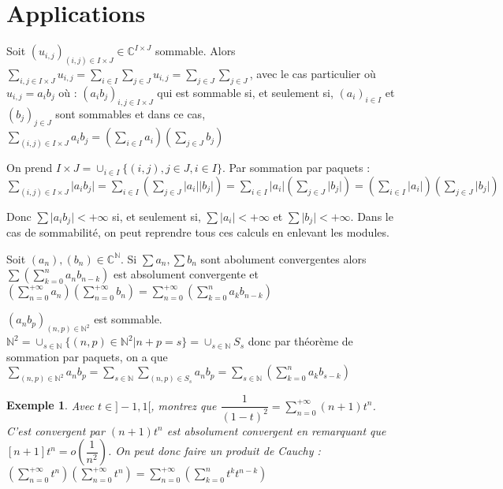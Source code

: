 \documentclass[a4paper,12pt]{book}
\newcommand{\Thr}[2]{\begin{tcolorbox}[sharp corners, colback=white,colframe=red!90!black!75, title=Théorème : #1]#2\end{tcolorbox}}
\newcommand{\Pre}[1]{\begin{tcolorbox}[sharp corners, colback=white,colframe=green!60!green!30!black!75, title=Preuve]#1\end{tcolorbox}}
\newtheorem{Exe}{Exemple}[section]
\def\C{\mathbb{C}}
\def\N{\mathbb{N}}
\begin{document}
\section{Applications}
\Thr{de Fubini}{Soit $(u_{i,j})_{(i,j)\in I\times J}\in\C^{I\times J}$ sommable. Alors $\sum\limits_{i,j\in I\times J} u_{i,j} = \sum\limits_{i\in I}\sum\limits_{j\in J}u_{i,j} = \sum\limits_{j\in J}\sum\limits_{j\in J}$, avec le cas particulier où $u_{i,j} = a_ib_j$ où : $(a_ib_j)_{i,j\in I\times J}$ qui est sommable si, et seulement si, $(a_i)_{i\in I}$ et $(b_j)_{j\in J}$ sont sommables et dans ce cas, $\sum\limits_{(i,j)\in I\times J} a_ib_j = \left(\sum\limits_{i\in I}a_i\right)\left(\sum\limits_{j\in J}b_j\right)$}
\Pre{On prend $I\times J = \cup_{i\in I}\{(i,j), j\in J, i\in I\}$. Par sommation par paquets : $\sum\limits_{(i,j)\in I\times J}\vert a_ib_j\vert = \sum\limits_{i\in I} \left(\sum\limits_{j\in J} \vert a_i\vert \vert b_j\vert\right) = \sum\limits_{i\in I}\vert a_i\vert \left(\sum\limits_{j\in J}\vert b_j\vert\right) = \left(\sum\limits_{i\in I}\vert a_i\vert\right)\left(\sum\limits_{j\in J}\vert b_j\vert\right)$
\par Donc $\sum\vert a_ib_j\vert<+\infty$ si, et seulement si, $\sum\vert a_i\vert<+\infty$ et $\sum\vert b_j\vert < +\infty$. Dans le cas de sommabilité, on peut reprendre tous ces calculs en enlevant les modules.}
\Thr{Produit de Cauchy}{Soit $(a_n), (b_n)\in\C^\N$. Si $\sum a_n, \sum b_n$ sont abolument convergentes alors $\sum\left(\sum\limits_{k=0}^na_nb_{n-k}\right)$ est absolument convergente et $\left(\sum\limits_{n=0}^{+\infty}a_n\right)\left(\sum\limits_{n=0}^{+\infty}b_n\right) = \sum\limits_{n=0}^{+\infty}\left(\sum\limits_{k=0}^n a_kb_{n-k}\right)$}
\Pre{$(a_nb_p)_{(n,p)\in\N^2}$ est sommable. $\N^2 = \cup_{s\in\N} \{(n,p)\in\N^2\vert n+p=s\} = \cup_{s\in\N} S_s$ donc par théorème de sommation par paquets, on a que $\sum\limits_{(n,p)\in\N^2}a_nb_p = \sum\limits_{s\in\N} \sum\limits_{(n,p)\in S_s}a_nb_p = \sum\limits_{s\in\N}\left(\sum\limits_{k=0}^na_kb_{s-k}\right)$}
\begin{Exe}
Avec $t\in]-1,1[$, montrez que $\dfrac{1}{(1-t)^2} = \sum\limits_{n=0}^{+\infty}(n+1)t^n$. C'est convergent par $(n+1)t^n$ est absolument convergent en remarquant que $[n+1]t^n = o(\dfrac{1}{n^2})$. On peut donc faire un produit de Cauchy : $\left(\sum\limits_{n=0}^{+\infty} t^n\right) \left(\sum\limits_{n=0}^{+\infty} t^n\right) = \sum\limits_{n=0}^{+\infty}\left(\sum\limits_{k=0}^n t^k t^{n-k}\right)$
\end{Exe}
\end{document}

